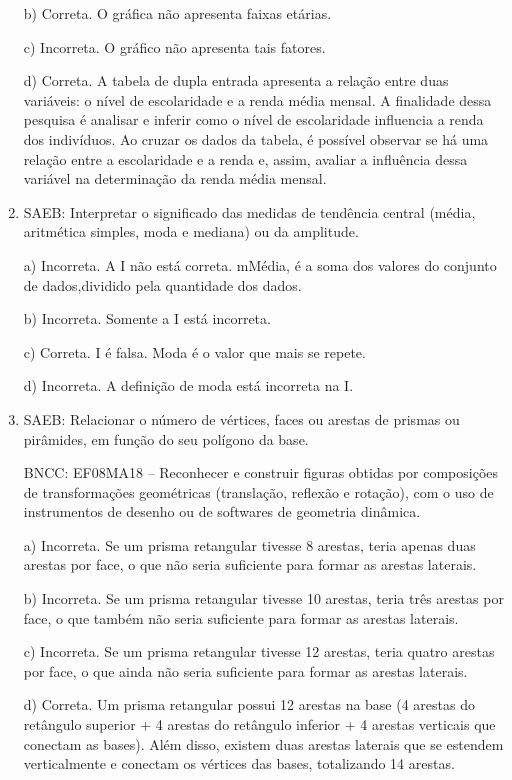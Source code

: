 \begin{enumerate}
b) Correta. O gráfica não apresenta faixas etárias.

c) Incorreta. O gráfico não apresenta tais fatores.

d) Correta. A tabela de dupla entrada apresenta a relação entre
duas variáveis: o nível de escolaridade e a renda média mensal. A
finalidade dessa pesquisa é analisar e inferir como o nível de
escolaridade influencia a renda dos indivíduos. Ao cruzar os dados da
tabela, é possível observar se há uma relação entre a escolaridade e a
renda e, assim, avaliar a influência dessa variável na determinação da
renda média mensal.

\item SAEB: Interpretar o significado das medidas de tendência central (média,
aritmética simples, moda e mediana) ou da amplitude.

a) Incorreta. A I não está correta. mMédia, é a soma dos valores do
conjunto de dados,dividido pela quantidade dos dados.

b) Incorreta. Somente a I está incorreta.

c) Correta. I é falsa. Moda é o valor que mais se repete.

d) Incorreta. A definição de moda está incorreta na I.

\item SAEB: Relacionar o número de vértices, faces ou arestas de prismas ou
pirâmides, em função do seu polígono da base.

BNCC: EF08MA18 -- Reconhecer e construir figuras obtidas por composições
de transformações geométricas (translação, reflexão e rotação), com o
uso de instrumentos de desenho ou de softwares de geometria dinâmica.

a) Incorreta. Se um prisma retangular tivesse 8 arestas, teria
apenas duas arestas por face, o que não seria suficiente para formar as
arestas laterais.

b) Incorreta. Se um prisma retangular tivesse 10 arestas, teria
três arestas por face, o que também não seria suficiente para formar as
arestas laterais.

c) Incorreta. Se um prisma retangular tivesse 12 arestas, teria
quatro arestas por face, o que ainda não seria suficiente para formar as
arestas laterais.

d) Correta. Um prisma retangular possui 12 arestas na base (4
arestas do retângulo superior + 4 arestas do retângulo inferior + 4
arestas verticais que conectam as bases). Além disso, existem duas
arestas laterais que se estendem verticalmente e conectam os vértices
das bases, totalizando 14 arestas.


\end{enumerate}

